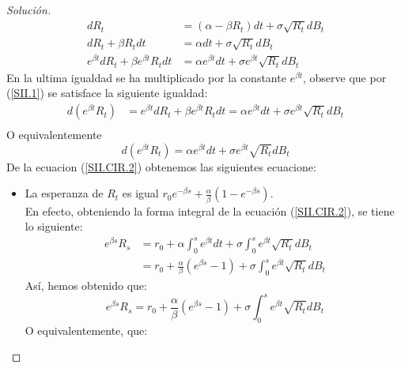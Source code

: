 \documentclass[11pt,notitlepage]{article}
\newenvironment{solucion}
  {\begin{proof}[Solución]}
  {\end{proof}}
\begin{document}
        \begin{solucion}
             \begin{align*}
                 dR_t &= (\alpha - \beta R_t)dt + \sigma\sqrt{R_t}dB_t\\
                 dR_t + \beta R_tdt &= \alpha dt + \sigma\sqrt{R_t}dB_t\\
                 e^{\beta t}dR_t +\beta e^{\beta t}R_t dt &= \alpha e^{\beta t}dt + \sigma e^{\beta t}\sqrt{R_t}dB_t
             \end{align*}
        En la ultima igualdad se ha multiplicado por la constante \(e^{\beta t}\), observe que por (\ref{SII.1}) se satisface 
        la siguiente igualdad: 
        \begin{align*}
            d\left(e^{\beta t}R_t \right)&=e^{\beta t}dR_t +\beta e^{\beta t}R_t dt = \alpha e^{\beta t}dt + \sigma e^{\beta t}\sqrt{R_t}dB_t\\
        \end{align*}
        O equivalentemente 
        \begin{equation}\label{SII.CIR.2}
             d\left(e^{\beta t}R_t \right)=\alpha e^{\beta t}dt + \sigma e^{\beta t}\sqrt{R_t}dB_t
        \end{equation}
        De la ecuacion (\ref{SII.CIR.2}) obtenemos las siguientes ecuacione: 
        \begin{itemize}
            \item La esperanza de \(R_t\) es igual \(r_0e^{-\beta s} + \frac{\alpha}{\beta}\left(1 - e^{-\beta s} \right)\).\\ En efecto, obteniendo 
            la forma integral de la ecuación (\ref{SII.CIR.2}), se tiene lo siguiente: 
            \begin{align*}
                e^{\beta s}R_s &= r_0 + \alpha\int_{0}^{s}e^{\beta t}dt + \sigma\int_{0}^{s}e^{\beta t}\sqrt{R_t}dB_t\\
                               &= r_0 +\frac{\alpha}{\beta}\left(e^{\beta s} - 1 \right) + \sigma\int_{0}^{s}e^{\beta t}\sqrt{R_t}dB_t
            \end{align*}
            Así, hemos obtenido que: 
            \begin{equation}\label{SII.CIR.3}
                e^{\beta s}R_s =  r_0 +\frac{\alpha}{\beta}\left(e^{\beta s} - 1 \right) + \sigma\int_{0}^{s}e^{\beta t}\sqrt{R_t}dB_t
            \end{equation}
            O equivalentemente, que: 
            \begin{equation}\label{SII.CIR.4}

\end{equation}
\end{itemize}
\end{solucion}
\end{document}
